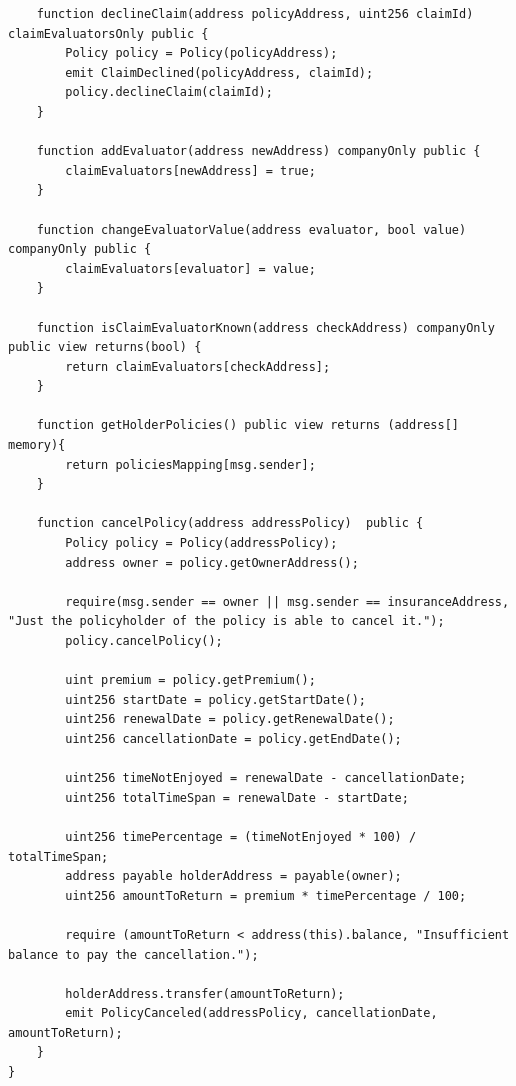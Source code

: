 \documentclass[a4paper,12pt]{article}
\begin{document}
\begin{appendices}
\begin{lstlisting}
    function declineClaim(address policyAddress, uint256 claimId) claimEvaluatorsOnly public {
        Policy policy = Policy(policyAddress);
        emit ClaimDeclined(policyAddress, claimId);
        policy.declineClaim(claimId);
    }

    function addEvaluator(address newAddress) companyOnly public {
        claimEvaluators[newAddress] = true;
    }

    function changeEvaluatorValue(address evaluator, bool value) companyOnly public {
        claimEvaluators[evaluator] = value;
    }

    function isClaimEvaluatorKnown(address checkAddress) companyOnly public view returns(bool) {
        return claimEvaluators[checkAddress];
    }

    function getHolderPolicies() public view returns (address[] memory){
        return policiesMapping[msg.sender];
    }

    function cancelPolicy(address addressPolicy)  public {
        Policy policy = Policy(addressPolicy);
        address owner = policy.getOwnerAddress();

        require(msg.sender == owner || msg.sender == insuranceAddress, "Just the policyholder of the policy is able to cancel it.");
        policy.cancelPolicy();

        uint premium = policy.getPremium();
        uint256 startDate = policy.getStartDate();
        uint256 renewalDate = policy.getRenewalDate();
        uint256 cancellationDate = policy.getEndDate();

        uint256 timeNotEnjoyed = renewalDate - cancellationDate;
        uint256 totalTimeSpan = renewalDate - startDate;

        uint256 timePercentage = (timeNotEnjoyed * 100) / totalTimeSpan;
        address payable holderAddress = payable(owner);
        uint256 amountToReturn = premium * timePercentage / 100;

        require (amountToReturn < address(this).balance, "Insufficient balance to pay the cancellation.");

        holderAddress.transfer(amountToReturn);
        emit PolicyCanceled(addressPolicy, cancellationDate, amountToReturn);
    }
}


\end{lstlisting}


\end{appendices}
\end{document}
